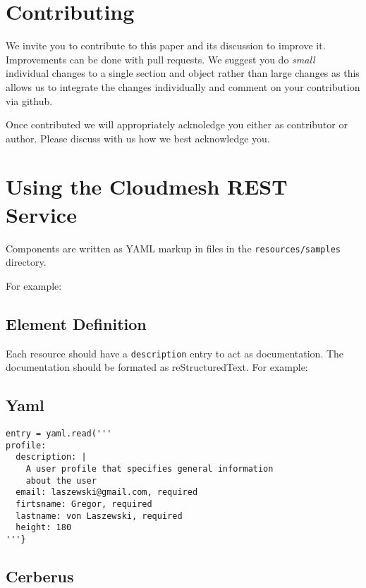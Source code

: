 \documentclass[9pt,twocolumn,twoside]{styles/osajnl}
\begin{document}
\newpage

\appendix


\section{Contributing}

We invite you to contribute to this paper and its discussion to
improve it. Improvements can be done with pull requests. We suggest
you do {\em small} individual changes to a single section and object
rather than large changes as this allows us to integrate the changes
individually and comment on your contribution via github.

Once contributed we will appropriately acknoledge you either as
contributor or author. Please discuss with us how we best acknowledge
you.

\section{Using the Cloudmesh REST Service} 

Components are written as YAML markup in files in the
\verb+resources/samples+ directory.

For example:

\subsection{Element Definition}

Each resource should have a \verb+description+ entry to act as
documentation. The documentation should be formated as
reStructuredText. For example:

\subsection{Yaml}

\begin{Verbatim}
entry = yaml.read('''
profile:
  description: |
    A user profile that specifies general information 
    about the user
  email: laszewski@gmail.com, required
  firtsname: Gregor, required
  lastname: von Laszewski, required
  height: 180
'''}
\end{Verbatim}

\subsection{Cerberus}
\end{document}
